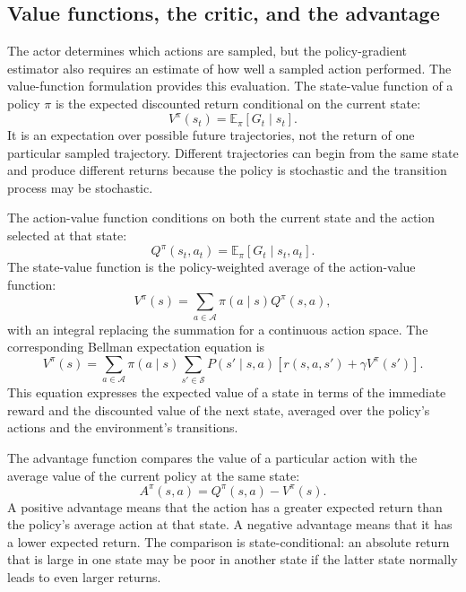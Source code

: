 \subsection{Value functions, the critic, and the advantage}
\label{subsec:ac-value-critic}

The actor determines which actions are sampled, but the policy-gradient
estimator also requires an estimate of how well a sampled action performed.
The value-function formulation provides this evaluation. The state-value
function of a policy \(\pi\) is the expected discounted return conditional
on the current state:
\begin{equation}
    V^\pi(s_t)
    =
    \mathbb{E}_{\pi}
    \left[
        G_t\mid s_t
    \right].
    \label{eq:ac-state-value}
\end{equation}
It is an expectation over possible future trajectories, not the return of
one particular sampled trajectory. Different trajectories can begin from
the same state and produce different returns because the policy is
stochastic and the transition process may be stochastic.

The action-value function conditions on both the current state and the
action selected at that state:
\begin{equation}
    Q^\pi(s_t,a_t)
    =
    \mathbb{E}_{\pi}
    \left[
        G_t\mid s_t,a_t
    \right].
    \label{eq:ac-action-value}
\end{equation}
The state-value function is the policy-weighted average of the action-value
function:
\begin{equation}
    V^\pi(s)
    =
    \sum_{a\in\mathcal{A}}
    \pi(a\mid s)Q^\pi(s,a),
    \label{eq:ac-vq-relation}
\end{equation}
with an integral replacing the summation for a continuous action space.
The corresponding Bellman expectation equation is
\begin{equation}
    V^\pi(s)
    =
    \sum_{a\in\mathcal{A}}\pi(a\mid s)
    \sum_{s'\in\mathcal{S}}P(s'\mid s,a)
    \left[
        r(s,a,s')+\gamma V^\pi(s')
    \right].
    \label{eq:ac-bellman}
\end{equation}
This equation expresses the expected value of a state in terms of the
immediate reward and the discounted value of the next state, averaged over
the policy's actions and the environment's transitions.

The advantage function compares the value of a particular action with the
average value of the current policy at the same state:
\begin{equation}
    A^\pi(s,a)
    =
    Q^\pi(s,a)-V^\pi(s).
    \label{eq:ac-advantage}
\end{equation}
A positive advantage means that the action has a greater expected return
than the policy's average action at that state. A negative advantage means
that it has a lower expected return. The comparison is state-conditional:
an absolute return that is large in one state may be poor in another state
if the latter state normally leads to even larger returns.

